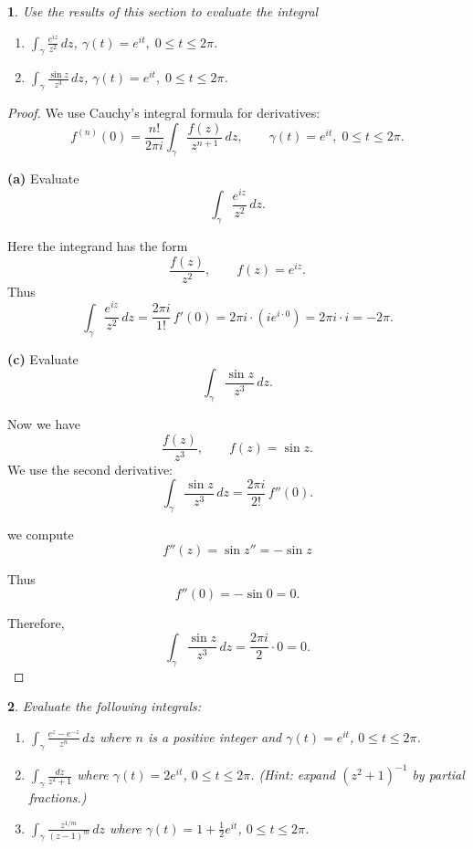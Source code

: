 \documentclass[12pt, a4paper]{report}
\theoremstyle{spaced}
\newtheorem{exercise}{}
\newcommand{\setexercise}[1]{\setcounter{exercise}{#1-1}}
\begin{document}
\setexercise{7}
\begin{exercise}
	Use the results of this section to evaluate the integral
	\begin{enumerate}[label=(\alph*)]
		\item $\displaystyle  \int_{\gamma} \frac{e^{iz}}{z^{2}}\,dz$,  $\gamma(t)=e^{it},\; 0\le t\le 2\pi$.


		\item[(c)] $\displaystyle \int_{\gamma} \frac{\sin z}{z^{3}}\,dz$,
			$\gamma(t)=e^{it},\; 0\le t\le 2\pi$.
	\end{enumerate}
\end{exercise}

\begin{proof}
	We use Cauchy's integral formula for derivatives:
	\[
		f^{(n)}(0)
		= \frac{n!}{2\pi i} \int_{\gamma} \frac{f(z)}{z^{n+1}}\,dz,
		\qquad \gamma(t)=e^{it},\;0\le t\le 2\pi.
	\]

	\textbf{(a)} Evaluate
	\[
		\int_{\gamma} \frac{e^{iz}}{z^{2}}\,dz.
	\]

	Here the integrand has the form
	\[
		\frac{f(z)}{z^{2}}, \qquad f(z)=e^{iz}.
	\]
	Thus
	\[
		\int_{\gamma} \frac{e^{iz}}{z^{2}}\,dz
		= \frac{2\pi i}{1!}\, f'(0)
		= 2\pi i \cdot (i e^{i\cdot 0})
		= 2\pi i \cdot i
		= -2\pi.
	\]

	\bigskip
	\textbf{(c)} Evaluate
	\[
		\int_{\gamma} \frac{\sin z}{z^{3}}\,dz.
	\]

	Now we have
	\[
		\frac{f(z)}{z^{3}}, \qquad f(z)=\sin z.
	\]
	We use the second derivative:
	\[
		\int_{\gamma} \frac{\sin z}{z^{3}}\,dz
		= \frac{2\pi i}{2!}\, f''(0).
	\]

	we compute
	\[
		f''(z)=\sin z'' = -\sin z
	\]

	Thus
	\[
		f''(0)= -\sin 0 = 0.
	\]

	Therefore,
	\[
		\int_{\gamma} \frac{\sin z}{z^{3}}\,dz
		= \frac{2\pi i}{2}\cdot 0
		= 0.
	\]

\end{proof}


\setexercise{9}
\begin{exercise}
	Evaluate the following integrals:
	\begin{enumerate}[label=(\alph*)]
		\item $\displaystyle \int_{\gamma} \frac{e^{z}-e^{-z}}{z^{n}}\,dz$
		      where $n$ is a positive integer and $\gamma(t)=e^{it}$, $0\le t\le 2\pi$.


		\item[(c)] $\displaystyle \int_{\gamma} \frac{dz}{z^{2}+1}$
			where $\gamma(t)=2e^{it}$, $0\le t\le 2\pi$. (Hint: expand $(z^{2}+1)^{-1}$ by partial fractions.)


		\item[(e)] $\displaystyle \int_{\gamma} \frac{z^{1/m}}{(z-1)^{m}}\,dz$
			where $\gamma(t)=1+\tfrac12 e^{it}$, $0\le t\le 2\pi$.
	\end{enumerate}
\end{exercise}
\end{document}

